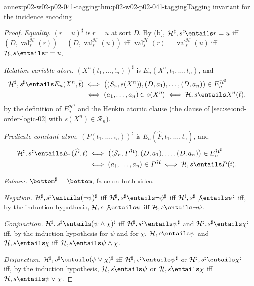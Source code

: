 \begin{annexitem}{annex:p02-w02-p02-041-tagging}{thm:p02-w02-p02-041-tagging}{Tagging invariant for the incidence encoding}
\begin{proof}
\emph{Equality.}  \((r=u)^\sharp\) is \(r=u\) at sort \(D\).  By (b),
\(\mathcal H^\sharp,s^\sharp\entails r=u\) iff
\((D,\operatorname{val}^{\mathcal H}_s(r))=(D,\operatorname{val}^{\mathcal
H}_s(u))\) iff \(\operatorname{val}^{\mathcal H}_s(r)=\operatorname{val}^{\mathcal
H}_s(u)\) iff \(\mathcal H,s\entails r=u\).

\emph{Relation-variable atom.}  \((X^n(t_1,\ldots,t_n))^\sharp\) is
\(E_n(X^n,t_1,\ldots,t_n)\), and
\[
\begin{aligned}
 \mathcal H^\sharp,s^\sharp\entails E_n(X^n,\bar t)
 &\iff\bigl((S_n,s(X^n)),(D,a_1),\ldots,(D,a_n)\bigr)\in E_n^{\mathcal H^\sharp}\\
 &\iff(a_1,\ldots,a_n)\in s(X^n)
 \iff\mathcal H,s\entails X^n(\bar t),
\end{aligned}
\]
by the definition of \(E_n^{\mathcal H^\sharp}\) and the Henkin atomic clause
(the clause of \cref{sec:second-order-logic-02} with \(s(X^n)\in\mathcal
R_n\)).

\emph{Predicate-constant atom.}  \((P(t_1,\ldots,t_n))^\sharp\) is
\(E_n(\widehat P,t_1,\ldots,t_n)\), and
\[
\begin{aligned}
 \mathcal H^\sharp,s^\sharp\entails E_n(\widehat P,\bar t)
 &\iff\bigl((S_n,P^{\mathcal H}),(D,a_1),\ldots,(D,a_n)\bigr)\in E_n^{\mathcal H^\sharp}\\
 &\iff(a_1,\ldots,a_n)\in P^{\mathcal H}
 \iff\mathcal H,s\entails P(\bar t).
\end{aligned}
\]

\emph{Falsum.}  \(\bottom^\sharp=\bottom\), false on both sides.

\emph{Negation.}  \(\mathcal H^\sharp,s^\sharp\entails(\neg\psi)^\sharp\) iff
\(\mathcal H^\sharp,s^\sharp\entails\neg\psi^\sharp\) iff
\(\mathcal H^\sharp,s^\sharp\not\entails\psi^\sharp\) iff, by the induction
hypothesis, \(\mathcal H,s\not\entails\psi\) iff
\(\mathcal H,s\entails\neg\psi\).

\emph{Conjunction.}  \(\mathcal H^\sharp,s^\sharp\entails(\psi\land\chi)^\sharp\)
iff \(\mathcal H^\sharp,s^\sharp\entails\psi^\sharp\) and
\(\mathcal H^\sharp,s^\sharp\entails\chi^\sharp\) iff, by the induction
hypothesis for \(\psi\) and for \(\chi\), \(\mathcal H,s\entails\psi\) and
\(\mathcal H,s\entails\chi\) iff \(\mathcal H,s\entails\psi\land\chi\).

\emph{Disjunction.}  \(\mathcal H^\sharp,s^\sharp\entails(\psi\lor\chi)^\sharp\)
iff \(\mathcal H^\sharp,s^\sharp\entails\psi^\sharp\) or
\(\mathcal H^\sharp,s^\sharp\entails\chi^\sharp\) iff, by the induction
hypothesis, \(\mathcal H,s\entails\psi\) or \(\mathcal H,s\entails\chi\) iff
\(\mathcal H,s\entails\psi\lor\chi\).


\end{proof}
\end{annexitem}
